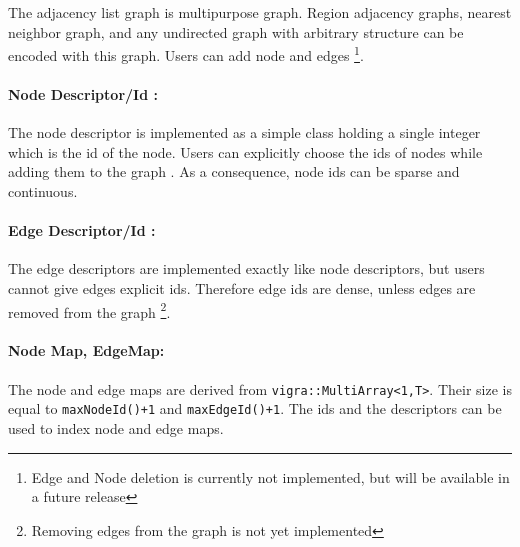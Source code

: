 The adjacency list graph is  multipurpose graph.
Region adjacency graphs, nearest neighbor graph,
and  any undirected graph with arbitrary structure can 
be encoded with this graph.
Users can add node and edges \footnote{Edge and Node deletion is currently
not implemented, but will be available in a future release}.


\paragraph{Node Descriptor/Id :}
The node descriptor is implemented as a simple class
holding a single integer which is the id 
of the node.
Users can explicitly choose the ids of
nodes while adding them to the graph . As a consequence, node ids can 
be sparse and continuous.

\paragraph{Edge Descriptor/Id :}
The edge descriptors are implemented exactly like
node descriptors, but users cannot give
edges explicit ids.
Therefore edge ids are dense, unless
edges are removed from the graph \footnote{Removing edges from the graph is
not yet implemented}.

\paragraph{Node Map, EdgeMap:} 
The node and edge maps are derived from \lstinline{vigra::MultiArray<1,T>}.
Their size is equal to \lstinline{maxNodeId()+1} and  \lstinline{maxEdgeId()+1}.
The ids and the descriptors can be used to index node and edge maps.


%
%
%
%


